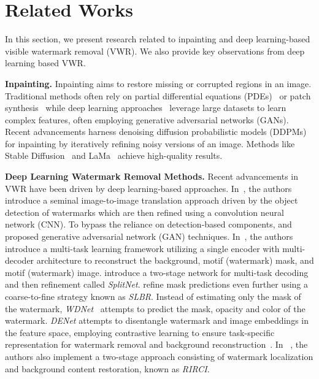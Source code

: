 \section{Related Works}
\label{sec:related_works}
In this section, we present research related to inpainting and deep learning-based visible watermark removal (VWR). We also provide key observations from deep learning based VWR.

\textbf{Inpainting.} Inpainting aims to restore missing or corrupted regions in an image. Traditional methods often rely on partial differential equations (PDEs)~\cite{bertalmio2006pde,schonlieb2015partial} or patch synthesis~\cite{criminisi2003object} while deep learning approaches~\cite{pathak2016context,nazeri2019edgeconnect,cai2022image} leverage large datasets to learn complex features, often employing generative adversarial networks (GANs). Recent advancements harness denoising diffusion probabilistic models (DDPMs)~\cite{ho2020denoising} for inpainting by iteratively refining noisy versions of an image. Methods like Stable Diffusion~\cite{rombach2021highresolution} and LaMa~\cite{suvorov2021resolution} achieve high-quality results.

\textbf{Deep Learning Watermark Removal Methods.} Recent advancements in VWR have been driven by deep learning-based approaches. In~\cite{cheng2018large}, the authors introduce a seminal image-to-image translation approach driven by the object detection of watermarks which are then refined using a convolution neural network (CNN). To bypass the reliance on detection-based components, \cite{li2019towards} and \cite{cao2019generative} proposed generative adversarial network (GAN) techniques. In~\cite{hertz2019blind}, the authors introduce a multi-task learning framework utilizing a single encoder with multi-decoder architecture to reconstruct the background, motif (watermark) mask, and motif (watermark) image. \cite{cun2021split} introduce a two-stage network for multi-task decoding and then refinement called \textit{SplitNet}. \cite{liang2021visible} refine mask predictions even further using a coarse-to-fine strategy known as \textit{SLBR}. Instead of estimating only the mask of the watermark, \textit{WDNet}~\cite{liu2021wdnet} attempts to predict the mask, opacity and color of the watermark. \textit{DENet} attempts to disentangle watermark and image embeddings in the feature space, employing contrastive learning to ensure task-specific representation for watermark removal and background reconstruction~\cite{sun2023denet}. In ~\cite{leng2024removing}, the authors also implement a two-stage approach consisting of watermark localization and background content restoration, known as \textit{RIRCI}.

